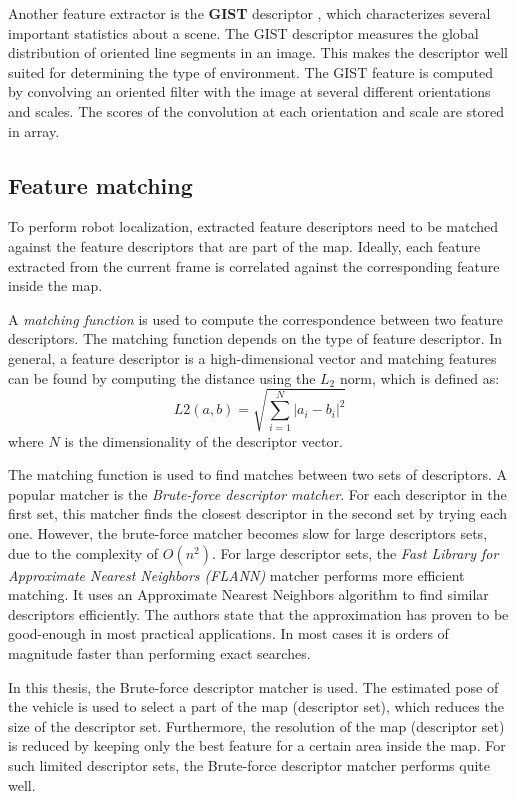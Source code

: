 Another feature extractor is the \textbf{GIST} descriptor \cite{oliva2001modeling}, which characterizes several important statistics about a scene.
The GIST descriptor measures the global distribution of oriented line segments in an image.
This makes the descriptor well suited for determining the type of environment.
The GIST feature is computed by convolving an oriented filter with the image at several different orientations and scales. 
The scores of the convolution at each orientation and scale are stored in array.

\subsection{Feature matching}
\label{sec:theory_feature_matching}
To perform robot localization, extracted feature descriptors need to be matched against the feature descriptors that are part of the map.
Ideally, each feature extracted from the current frame is correlated against the corresponding feature inside the map.

A \textit{matching function} is used to compute the correspondence between two feature descriptors.
The matching function depends on the type of feature descriptor.
In general, a feature descriptor is a high-dimensional vector and matching features can be found by computing the distance using the $L_2$ norm, which is defined as:
\begin{equation}
L2(a,b) =\sqrt { \sum_{i=1}^{N} \left| a_i - b_i \right| ^2 }
\end{equation}
where $N$ is the dimensionality of the descriptor vector.

The matching function is used to find matches between two sets of descriptors.
A popular matcher is the \textit{Brute-force descriptor matcher}. For each descriptor in the first set, this matcher finds the closest descriptor in the second set by trying each one.
However, the brute-force matcher becomes slow for large descriptors sets, due to the complexity of $O(n^2)$.
For large descriptor sets, the \textit{Fast Library for Approximate Nearest Neighbors (FLANN)} \cite{muja2009flann} matcher performs more efficient matching.
It uses an Approximate Nearest Neighbors algorithm to find similar descriptors efficiently.
The authors state that the approximation has proven to be good-enough in most practical applications.
In most cases it is orders of magnitude faster than performing exact searches.

In this thesis, the Brute-force descriptor matcher is used.
The estimated pose of the vehicle is used to select a part of the map (descriptor set), which reduces the size of the descriptor set.
Furthermore, the resolution of the map (descriptor set) is reduced by keeping only the best feature for a certain area inside the map.
For such limited descriptor sets, the Brute-force descriptor matcher performs quite well.


